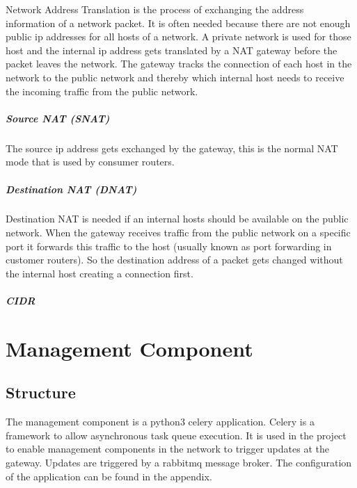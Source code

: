 \documentclass{report}
\begin{document}
Network Address Translation is the process of exchanging the address
information of a network packet. It is often needed because there are
not enough public ip addresses for all hosts of a network. A private
network is used for those host and the internal ip address gets
translated by a NAT gateway before the packet leaves the network. The
gateway tracks the connection of each host in the network to the public
network and thereby which internal host needs to receive the incoming
traffic from the public network.

\paragraph{Source NAT (SNAT)}

The source ip address gets exchanged by the gateway, this is the normal
NAT mode that is used by consumer routers.

\paragraph{Destination NAT (DNAT)}

Destination NAT is needed if an internal hosts should be available on
the public network. When the gateway receives traffic from the public
network on a specific port it forwards this traffic to the host (usually
known as port forwarding in customer routers). So the destination
address of a packet gets changed without the internal host creating a
connection first.

\paragraph{CIDR} 


\chapter{Management Component}\label{management-component}

\section{Structure}\label{structure}

The management component is a python3 celery application. Celery is a
framework to allow asynchronous task queue execution\cite{celery}. It is used
in the project to enable management components in the network to trigger
updates at the gateway. Updates are triggered by a rabbitmq message
broker\cite{rabbit}. The configuration of the application can be found in the
appendix.
\end{document}
